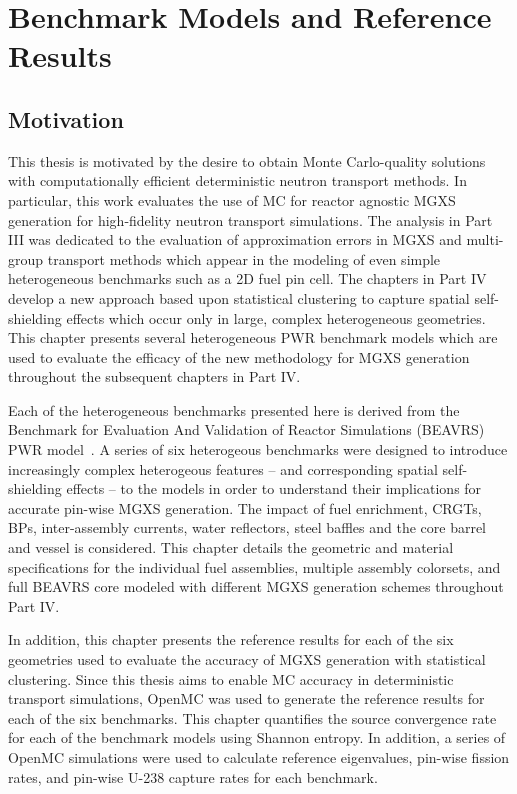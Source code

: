 \chapter{Benchmark Models and Reference Results}
\label{chap:benchmarks}

\section{Motivation}
\label{sec:chap7-motivate}

This thesis is motivated by the desire to obtain Monte Carlo-quality solutions with computationally efficient deterministic neutron transport methods. In particular, this work evaluates the use of \ac{MC} for reactor agnostic \ac{MGXS} generation for high-fidelity neutron transport simulations. The analysis in Part III was dedicated to the evaluation of approximation errors in \ac{MGXS} and multi-group transport methods which appear in the modeling of even simple heterogeneous benchmarks such as a 2D fuel pin cell. The chapters in Part IV develop a new approach based upon statistical clustering to capture spatial self-shielding effects which occur only in large, complex heterogeneous geometries. This chapter presents several heterogeneous \ac{PWR} benchmark models which are used to evaluate the efficacy of the new methodology for \ac{MGXS} generation throughout the subsequent chapters in Part IV.

Each of the heterogeneous benchmarks presented here is derived from the Benchmark for Evaluation And Validation of Reactor Simulations (BEAVRS) \ac{PWR} model~\cite{horelik2013beavrs}. A series of six heterogeous benchmarks were designed to introduce increasingly complex heterogeous features -- and corresponding spatial self-shielding effects -- to the models in order to understand their implications for accurate pin-wise \ac{MGXS} generation. The impact of fuel enrichment, \acp{CRGT}, \acp{BP}, inter-assembly currents, water reflectors, steel baffles and the core barrel and vessel is considered. This chapter details the geometric and material specifications for the individual fuel assemblies, multiple assembly colorsets, and full \ac{BEAVRS} core modeled with different \ac{MGXS} generation schemes throughout Part IV.

In addition, this chapter presents the reference results for each of the six geometries used to evaluate the accuracy of \ac{MGXS} generation with statistical clustering. Since this thesis aims to enable \ac{MC} accuracy in deterministic transport simulations, OpenMC was used to generate the reference results for each of the six benchmarks. This chapter quantifies the source convergence rate for each of the benchmark models using Shannon entropy. In addition, a series of OpenMC simulations were used to calculate reference eigenvalues, pin-wise fission rates, and pin-wise U-238 capture rates for each benchmark.

